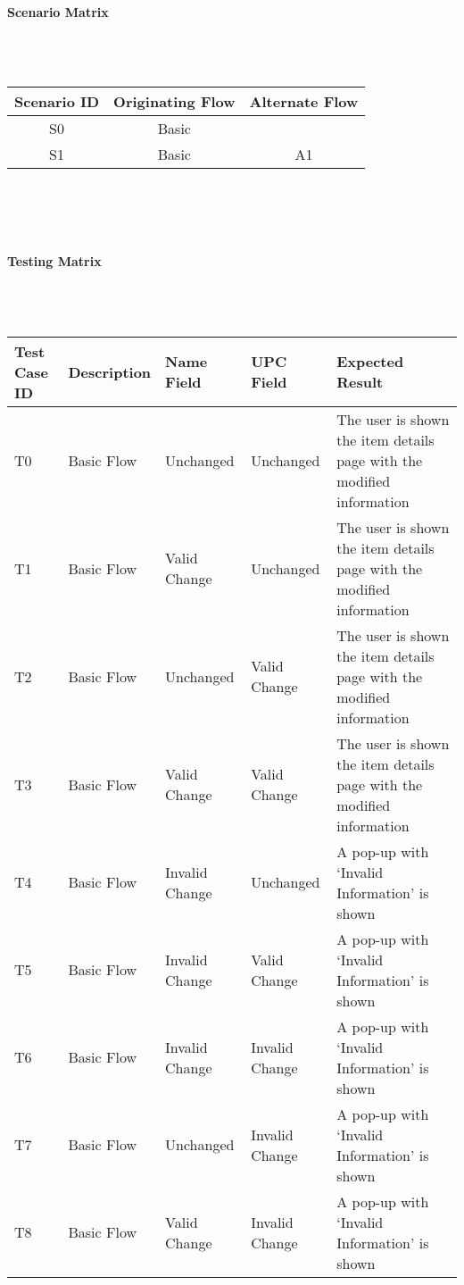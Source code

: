 \documentclass{article}
\begin{document}
\paragraph{Scenario Matrix}~\\ \\
\begin{tabular}{ c  c  c }
\hline
Scenario ID & Originating Flow & Alternate Flow\\
\hline
\hline
S0 & Basic & \\
\hline
S1 & Basic & A1\\
\hline
\end{tabular}\\
~\\
~\\
\paragraph{Testing Matrix}~\\ \\
\begin{tabular}{ p{0.6in}  p{0.8in}  p{1.0in}  p{1.0in}  p{2.0in}}
\hline
Test Case ID & Description & Name Field & UPC Field & Expected Result\\
\hline
\hline
T0 & Basic Flow & Unchanged & Unchanged & The user is shown the item details page with the modified information\\
\hline
T1 & Basic Flow & Valid Change & Unchanged & The user is shown the item details page with the modified information\\
\hline
T2 & Basic Flow & Unchanged & Valid Change & The user is shown the item details page with the modified information\\
\hline
T3 & Basic Flow & Valid Change & Valid Change & The user is shown the item details page with the modified information\\
\hline
T4 & Basic Flow & Invalid Change & Unchanged & A pop-up with `Invalid Information' is shown\\
\hline
T5 & Basic Flow & Invalid Change & Valid Change & A pop-up with `Invalid Information' is shown\\
\hline
T6 & Basic Flow & Invalid Change & Invalid Change & A pop-up with `Invalid Information' is shown\\
\hline
T7 & Basic Flow & Unchanged & Invalid Change & A pop-up with `Invalid Information' is shown\\
\hline
T8 & Basic Flow & Valid Change & Invalid Change & A pop-up with `Invalid Information' is shown\\
\hline
\end{tabular}\\
~\\
~\\
\end{document}
